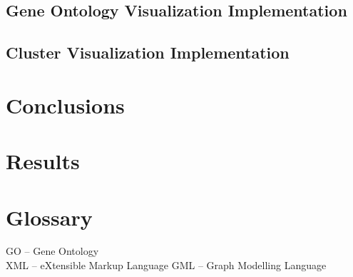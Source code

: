 \documentclass[a4paper,oneside]{article}
\begin{document}
\subsection{Gene Ontology Visualization Implementation}
\subsection{Cluster Visualization Implementation}
	
\section{Conclusions}
\section{Results}

\section{Glossary}
GO -- Gene Ontology\\
XML -- eXtensible Markup Language
GML -- Graph Modelling Language
\end{document}
